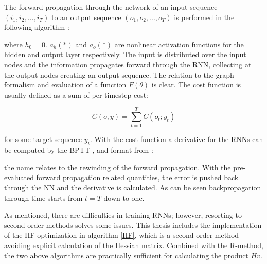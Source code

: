 The forward propagation through the network of an input sequence \((i_1, i_2, ... , i_T)\) to an output sequence \((o_1, o_2, ..., o_T) \) is performed in the following algorithm \cite{suts}:

\begin{algorithmic}[1]
    \EndFor
\end{algorithmic}

\noindent
where $h_0 = 0$. $a_h(*)$ and $a_o(*)$ are nonlinear activation functions for the hidden and output layer respectively. The input is distributed over the input nodes and the information propagates forward through the RNN, collecting at the output nodes creating an output sequence. The relation to the graph formalism and evaluation of a function $F(\theta)$ is clear. The cost function is usually defined as a sum of per-timestep cost:

\[C(o, y) = \sum_{t=1}^{T}C(o_t; y_t)\]

\noindent
for some target sequence $y_t$. With the cost function a derivative for the RNNs can be computed by the BPTT \cite{RNN1}, and format from \cite{suts}:

\begin{algorithmic}[1]
    \EndFor
    \State {}
\end{algorithmic}

\noindent
the name relates to the rewinding of the forward propagation. With the pre-evaluated forward propagation related quantities, the error is pushed back through the NN and the derivative is calculated. As can be seen backpropagation through time starts from $t=T$ down to one.

As mentioned, there are difficulties in training RNNs; however, resorting to second-order methods solves some issues. This thesis includes the implementation of the HF optimization \cite{suts} in algorithm \ref{HF}, which is a second-order method avoiding explicit calculation of the Hessian matrix. Combined with the R-method, the two above algorithms are practically sufficient for calculating the product $Hv$. 

